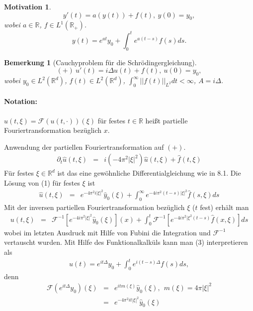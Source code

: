 \documentclass[12pt]{extreport} %
\newtheorem{Bemerkung}[Satz]{Bemerkung}
\newtheorem{Motivation}[Satz]{Motivation}
\numberwithin{equation}{section}
\newcommand{\R}{\mathbb{R}} %
\newcommand{\f}{\hat{f}}
\newcommand{\F}{\mathcal{F}}
\newcommand{\m}{\cdot}
\newcommand{\laplace}{\Delta}
\begin{document}
	\begin{Motivation}
		$$y'(t) = a(y(t))+ f(t), ~y(0) = y_0,$$
		wobei $a\in \R$, $f\in L^1(\R_+)$.
		$$y(t) = e^{at}y_0+\int_{0}^{t}e^{a(t-s)}f(s)ds.$$
	\end{Motivation}
	
	\begin{Bemerkung}[Cauchyproblem für die Schrödingergleichung]
		$$(+)~u'(t) = i\laplace u(t) +f(t),~ u(0) = y_0,$$
		wobei $y_0\in L^2(\R^d)$, $f(t)\in L^2(\R^d)$, $\int_{0}^{\infty}||f(t)||_{L^2}dt<\infty$, $A = i\laplace$.
	\end{Bemerkung}
	
	\paragraph{Notation:} $\hat{u}(t,\xi)  =\F(u(t,\m))(\xi)$ für festes $t\in \R$ heißt partielle Fouriertransformation bezüglich $x$.
	
	Anwendung der partiellen Fouriertransformation auf $(+)$.
	\begin{eqnarray}
		\partial_t \hat u(t,\xi) &=& i(-4\pi^2|\xi|^2)\hat u(t,\xi) +\f(t,\xi) 
	\end{eqnarray}
	Für festes $\xi\in \R^d$ ist das eine gewöhnliche Differentialgleichung wie in 8.1. Die Lösung von (1) für festes $\xi$ ist
	\begin{eqnarray}
		\hat u(t,\xi) &=& e^{-4\pi^2i|\xi|^2}\hat{y}_0(\xi)+\int_{0}^{\infty} e^{-4i\pi^2(t-s)|\xi|^2}\f(s,\xi)ds
	\end{eqnarray}
	Mit der inversen partiellen Fouriertransformation bezüglich $\xi$ ($t$ fest) erhält man
	\begin{eqnarray}
		u(t,\xi) &=& \F^{-1}\left[e^{-4i\pi^2|\xi|^2}\hat{y}_0(\xi) \right](x) +\int_{0}^{t}\F^{-1}\left[e^{-4i\pi^2|\xi^2(t-s)}\f(x,\xi)\right]ds
	\end{eqnarray}
	wobei im letzten Ausdruck mit Hilfe von Fubini die Integration und $\F^{-1}$ vertauscht wurden. Mit Hilfe des Funktionalkalküls kann man (3) interpretieren als
	\begin{eqnarray}
		\boxed{u(t) = e^{it\laplace}y_0 +\int_0^t e^{i(t-s)\laplace}f(s) ds,}
	\end{eqnarray}
	denn
	\begin{eqnarray}
		\F(e^{it\laplace}y_0)(\xi) &=& e^{itm(\xi)}\hat{y}_0(\xi),~~ m(\xi) = 4\pi|\xi|^2\nonumber\\
		&=& e^{-4\pi^2 it|\xi|^2}\hat{y}_0(\xi)\nonumber
	\end{eqnarray}
	
\end{document}
